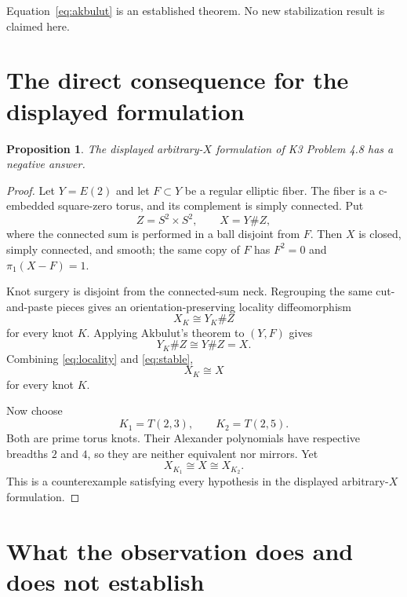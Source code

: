 \documentclass[11pt]{article}
\newtheorem{proposition}{Proposition}
\theoremstyle{remark}
\begin{document}
Equation~\eqref{eq:akbulut} is an established theorem.  No new
stabilization result is claimed here.

\section{The direct consequence for the displayed formulation}

\begin{proposition}\label{prop:scope}
The displayed arbitrary-$X$ formulation of K3 Problem 4.8 has a negative
answer.
\end{proposition}

\begin{proof}
Let $Y=E(2)$ and let $F\subset Y$ be a regular elliptic fiber.  The fiber is
a c-embedded square-zero torus, and its complement is simply connected.
Put
\[
  Z=S^2\times S^2,
  \qquad X=Y\# Z,
\]
where the connected sum is performed in a ball disjoint from $F$.
Then $X$ is closed, simply connected, and smooth; the same copy of $F$ has
$F^2=0$ and $\pi_1(X-F)=1$.

Knot surgery is disjoint from the connected-sum neck.  Regrouping the same
cut-and-paste pieces gives an orientation-preserving locality
diffeomorphism
\begin{equation}\label{eq:locality}
  X_K\cong Y_K\# Z
\end{equation}
for every knot $K$.  Applying Akbulut's theorem to $(Y,F)$ gives
\begin{equation}\label{eq:stable}
  Y_K\# Z\cong Y\# Z=X.
\end{equation}
Combining \eqref{eq:locality} and \eqref{eq:stable},
\[
  X_K\cong X
\]
for every knot $K$.

Now choose
\[
  K_1=T(2,3),
  \qquad K_2=T(2,5).
\]
Both are prime torus knots.  Their Alexander polynomials have respective
breadths $2$ and $4$, so they are neither equivalent nor mirrors.  Yet
\[
  X_{K_1}\cong X\cong X_{K_2}.
\]
This is a counterexample satisfying every hypothesis in the displayed
arbitrary-$X$ formulation.
\end{proof}

\section{What the observation does and does not establish}
\end{document}
